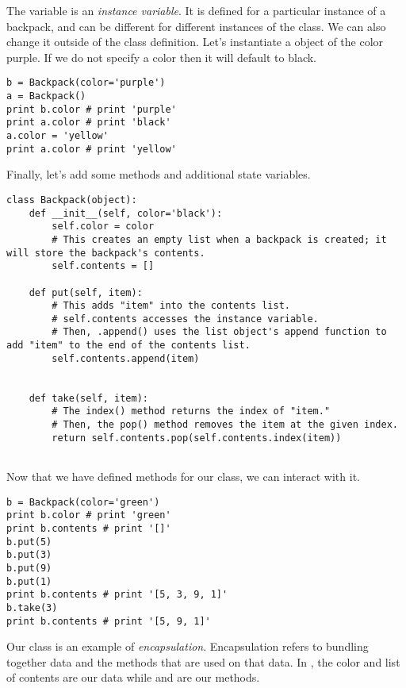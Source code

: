 The variable  is an \emph{instance variable}. It is defined for a particular instance of a backpack, and can be different for different instances of the class.
We can also change it outside of the class definition.
Let's instantiate a  object of the color purple.
If we do not specify a color then it will default to black.

\begin{lstlisting}
b = Backpack(color='purple')
a = Backpack()
print b.color # print 'purple'
print a.color # print 'black'
a.color = 'yellow'
print a.color # print 'yellow'
\end{lstlisting}


Finally, let's add some methods and additional state variables.

\begin{lstlisting}
class Backpack(object):
    def __init__(self, color='black'):
        self.color = color
        # This creates an empty list when a backpack is created; it will store the backpack's contents.
        self.contents = []

    def put(self, item):
        # This adds "item" into the contents list.
        # self.contents accesses the instance variable.
        # Then, .append() uses the list object's append function to add "item" to the end of the contents list.
        self.contents.append(item)


    def take(self, item):
        # The index() method returns the index of "item."
        # Then, the pop() method removes the item at the given index.
        return self.contents.pop(self.contents.index(item))


\end{lstlisting}

Now that we have defined methods for our  class, we can interact with it.


\begin{lstlisting}
b = Backpack(color='green')
print b.color # print 'green'
print b.contents # print '[]'
b.put(5)
b.put(3)
b.put(9)
b.put(1)
print b.contents # print '[5, 3, 9, 1]'
b.take(3)
print b.contents # print '[5, 9, 1]'
\end{lstlisting}

Our  class is an example of \emph{encapsulation}.
Encapsulation refers to bundling together data and the methods that are used on that data.
In , the color and list of contents are our data while  and  are our methods.

